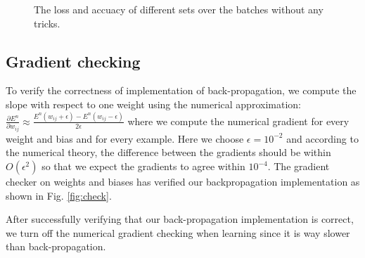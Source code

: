 \documentclass{article} %
\begin{document}
\begin{figure} [!htbp]
	
	\caption{The loss and accuacy of different sets over the batches without any tricks. }  
	\label{figure: 1}
	
\end{figure}

\subsection{Gradient checking}
To verify the correctness of implementation of back-propagation, we compute the slope with respect to one weight using the numerical approximation: $\frac{\partial E^{n}}{\partial w_{ij}} \approx \frac{E^{n}(w_{ij}+\epsilon)-E^{n}(w_{ij}-\epsilon)}{2\epsilon}$ where we compute the numerical gradient for every weight and bias and for every example. Here we choose $\epsilon = 10^{-2}$ and according to the numerical theory, the difference between the gradients should be within $O(\epsilon^{2})$ so that we expect the gradients to agree within $10^{-4}$. The gradient checker on weights and biases has verified our backpropagation implementation as shown in Fig. \ref{fig:check}.

After successfully verifying that our back-propagation implementation is correct, we turn off the numerical gradient checking when learning since it is way slower than back-propagation.
\end{document}
